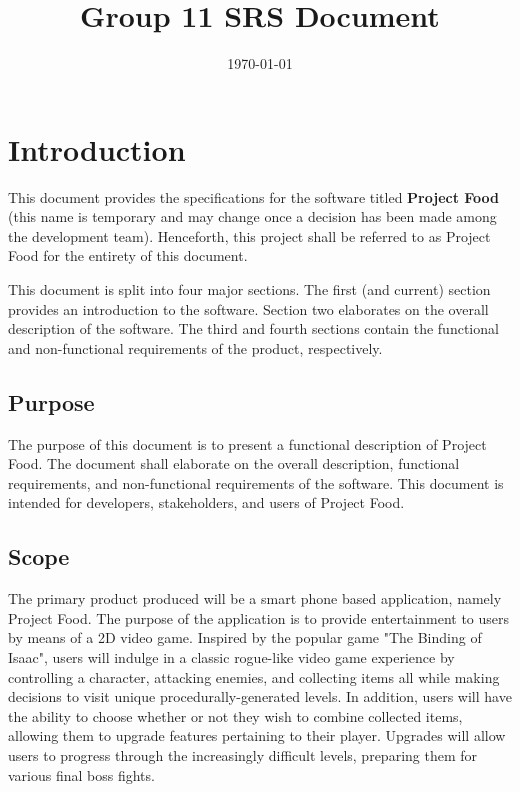 \documentclass[12pt, titlepage]{article}
\title{Group 11 SRS Document}
\author{}
\date{\today}
\begin{document}
\maketitle

\tableofcontents
\listoftables
\listoffigures

\newpage


\section{Introduction}
This document provides the specifications for the software titled \textbf{Project Food} (this name is temporary and may change once a decision has been made among the development team). Henceforth, this project shall be referred to as Project Food for the entirety of this document.

This document is split into four major sections. The first (and current) section provides an introduction to the software. Section two elaborates on the overall description of the software. The third and fourth sections contain the functional and non-functional requirements of the product, respectively.

  \subsection{Purpose}
  The purpose of this document is to present a functional description of Project Food. The document shall elaborate on the overall description, functional requirements, and non-functional requirements of the software. This document is intended for developers, stakeholders, and users of Project Food.
  \subsection{Scope}

  The primary product produced will be a smart phone based application, namely Project Food. The purpose of the application is to provide entertainment to users by means of a 2D video game. Inspired by the popular game "The Binding of Isaac", users will indulge in a classic rogue-like video game experience by controlling a character, attacking enemies, and collecting items all while making decisions to visit unique procedurally-generated levels. In addition, users will have the ability to choose whether or not they wish to combine collected items, allowing them to upgrade features pertaining to their player. Upgrades will allow users to progress through the increasingly difficult levels, preparing them for various final boss fights.
\end{document}
